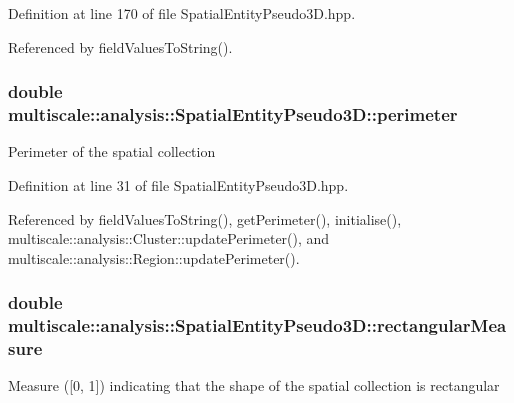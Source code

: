 Definition at line 170 of file Spatial\-Entity\-Pseudo3\-D.\-hpp.



Referenced by field\-Values\-To\-String().

\hypertarget{classmultiscale_1_1analysis_1_1SpatialEntityPseudo3D_aee84039be272f902a2d871f61da47360}{
\subsubsection[{perimeter}]{\setlength{\rightskip}{0pt plus 5cm}double multiscale\-::analysis\-::\-Spatial\-Entity\-Pseudo3\-D\-::perimeter\hspace{0.3cm}{\ttfamily [protected]}}}\label{classmultiscale_1_1analysis_1_1SpatialEntityPseudo3D_aee84039be272f902a2d871f61da47360}
Perimeter of the spatial collection 

Definition at line 31 of file Spatial\-Entity\-Pseudo3\-D.\-hpp.



Referenced by field\-Values\-To\-String(), get\-Perimeter(), initialise(), multiscale\-::analysis\-::\-Cluster\-::update\-Perimeter(), and multiscale\-::analysis\-::\-Region\-::update\-Perimeter().

\hypertarget{classmultiscale_1_1analysis_1_1SpatialEntityPseudo3D_aabb799c34513ed1d3008d807cdbdea29}{
\subsubsection[{rectangular\-Measure}]{\setlength{\rightskip}{0pt plus 5cm}double multiscale\-::analysis\-::\-Spatial\-Entity\-Pseudo3\-D\-::rectangular\-Measure\hspace{0.3cm}{\ttfamily [protected]}}}\label{classmultiscale_1_1analysis_1_1SpatialEntityPseudo3D_aabb799c34513ed1d3008d807cdbdea29}
Measure (\mbox{[}0, 1\mbox{]}) indicating that the shape of the spatial collection is rectangular 

